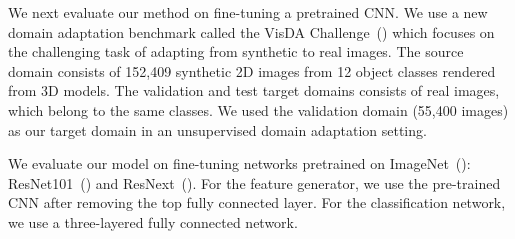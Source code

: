 \documentclass{article} \usepackage{iclr2018_conference,times}
\begin{document}
\begin{table}[h]
  \begin{center}
    \caption{{\small Results on digits datasets. Please note that  means the result obtained using a few labeled target samples for validation. The reported accuracy of our method is obtained from . ENT is our proposed baseline method. We implement entropy minimization based adversarial training as we mentioned in Appendix \ref{append:ent}.} }
\label{table:exp_scratch}
\end{center}
\vspace{-3mm}
\end{table}

We next evaluate our method on fine-tuning a pretrained CNN. We use a new domain adaptation benchmark called the VisDA Challenge~(\cite{visda}) which focuses on the challenging task of adapting from synthetic to real images. The source domain consists of 152,409 synthetic 2D images from 12 object classes rendered from 3D models. The validation and test target domains consists of real images, which belong to the same classes. We used the validation domain (55,400 images) as our target domain in an unsupervised domain adaptation setting. 

We evaluate our model on fine-tuning networks pretrained on ImageNet~(\cite{deng2009imagenet}):
 ResNet101~(\cite{he2016deep}) and ResNext~(\cite{xie2016aggregated}). For the feature generator, we use the pre-trained CNN after removing the top fully connected layer. For the classification network, we use a three-layered fully connected network.
\end{document}
